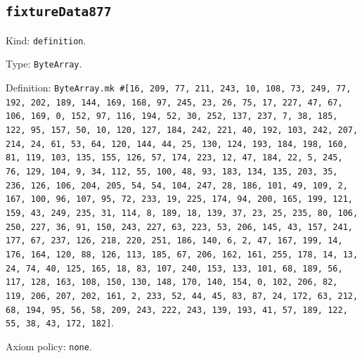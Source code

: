 \documentclass[11pt]{article}
\begin{document}
\subsection*{\texttt{fixtureData877}}
\noindent Kind: \texttt{definition}.\par
\noindent Type: \texttt{ByteArray}.\par
\noindent Definition: \texttt{ByteArray.mk \#[16, 209, 77, 211, 243, 10, 108, 73, 249, 77, 192, 202, 189, 144, 169, 168, 97, 245, 23, 26, 75, 17, 227, 47, 67, 106, 169, 0, 152, 97, 116, 194, 52, 30, 252, 137, 237, 7, 38, 185, 122, 95, 157, 50, 10, 120, 127, 184, 242, 221, 40, 192, 103, 242, 207, 214, 24, 61, 53, 64, 120, 144, 44, 25, 130, 124, 193, 184, 198, 160, 81, 119, 103, 135, 155, 126, 57, 174, 223, 12, 47, 184, 22, 5, 245, 76, 129, 104, 9, 34, 112, 55, 100, 48, 93, 183, 134, 135, 203, 35, 236, 126, 106, 204, 205, 54, 54, 104, 247, 28, 186, 101, 49, 109, 2, 167, 100, 96, 107, 95, 72, 233, 19, 225, 174, 94, 200, 165, 199, 121, 159, 43, 249, 235, 31, 114, 8, 189, 18, 139, 37, 23, 25, 235, 80, 106, 250, 227, 36, 91, 150, 243, 227, 63, 223, 53, 206, 145, 43, 157, 241, 177, 67, 237, 126, 218, 220, 251, 186, 140, 6, 2, 47, 167, 199, 14, 176, 164, 120, 88, 126, 113, 185, 67, 206, 162, 161, 255, 178, 14, 13, 24, 74, 40, 125, 165, 18, 83, 107, 240, 153, 133, 101, 68, 189, 56, 117, 128, 163, 108, 150, 130, 148, 170, 140, 154, 0, 102, 206, 82, 119, 206, 207, 202, 161, 2, 233, 52, 44, 45, 83, 87, 24, 172, 63, 212, 68, 194, 95, 56, 58, 209, 243, 222, 243, 139, 193, 41, 57, 189, 122, 55, 38, 43, 172, 182]}.\par
\noindent Axiom policy: \texttt{none}.\par
\end{document}
